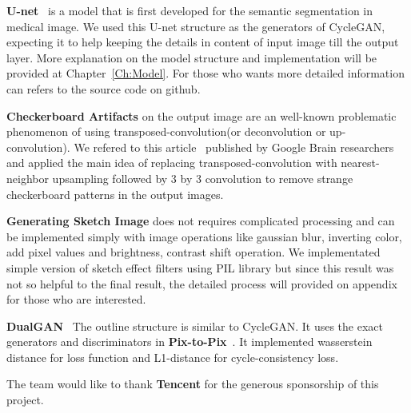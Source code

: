 \textbf{U-net}~\cite{unet} is a model that is first developed for the semantic segmentation in medical image. We used this U-net structure as the generators of CycleGAN, expecting it to help keeping the details in content of input image till the output layer. More explanation on the model structure and implementation will be provided at Chapter~\ref{Ch:Model}. For those who wants more detailed information can refers to the source code on github.

\textbf{Checkerboard Artifacts} on the output image are an well-known problematic phenomenon of using transposed-convolution(or deconvolution or up-convolution). We refered to this article~\cite{odena2016deconvolution} published by Google Brain researchers and applied the main idea of replacing transposed-convolution with nearest-neighbor upsampling followed by 3 by 3 convolution to remove strange checkerboard patterns in the output images.

\textbf{Generating Sketch Image} does not requires complicated processing and can be implemented simply with image operations like gaussian blur, inverting color, add pixel values and brightness, contrast shift operation. We implementated simple version of sketch effect filters using PIL library but since this result was not so helpful to the final result, the detailed process will provided on appendix for those who are interested.

\textbf{DualGAN}~\cite{DualGAN} The outline structure is similar to CycleGAN. It uses the exact generators and discriminators in \textbf{Pix-to-Pix}~\cite{pix2pix}. It implemented wasserstein distance for loss function and L1-distance for cycle-consistency loss.

The team would like to thank \textbf{Tencent} for the generous sponsorship of this project.

\endinput




